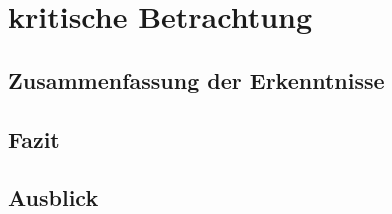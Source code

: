 \chapter{kritische Betrachtung} \label{kritischeBetrachtung}
\section{Zusammenfassung der Erkenntnisse}
\section{Fazit}
\section{Ausblick}